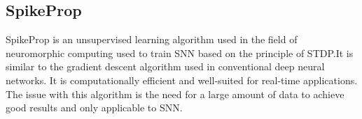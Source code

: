 \subsection{SpikeProp}
SpikeProp\cite{spikeprop} is an unsupervised learning algorithm used in the
field of neuromorphic computing used to train SNN based on the principle of
STDP.\@ It is similar to the gradient descent algorithm used in conventional
deep neural networks. It is computationally efficient and well-suited for
real-time applications. The issue with this algorithm is the need for a large
amount of data to achieve good results and only applicable to SNN.\@
